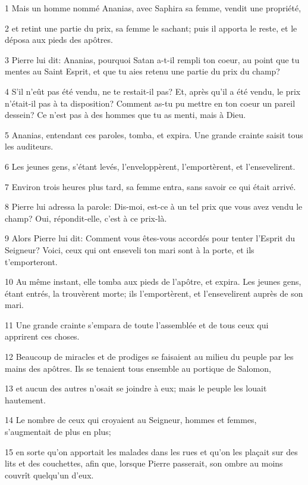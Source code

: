 \par 1 Mais un homme nommé Ananias, avec Saphira sa femme, vendit une propriété,
\par 2 et retint une partie du prix, sa femme le sachant; puis il apporta le reste, et le déposa aux pieds des apôtres.
\par 3 Pierre lui dit: Ananias, pourquoi Satan a-t-il rempli ton coeur, au point que tu mentes au Saint Esprit, et que tu aies retenu une partie du prix du champ?
\par 4 S'il n'eût pas été vendu, ne te restait-il pas? Et, après qu'il a été vendu, le prix n'était-il pas à ta disposition? Comment as-tu pu mettre en ton coeur un pareil dessein? Ce n'est pas à des hommes que tu as menti, mais à Dieu.
\par 5 Ananias, entendant ces paroles, tomba, et expira. Une grande crainte saisit tous les auditeurs.
\par 6 Les jeunes gens, s'étant levés, l'enveloppèrent, l'emportèrent, et l'ensevelirent.
\par 7 Environ trois heures plus tard, sa femme entra, sans savoir ce qui était arrivé.
\par 8 Pierre lui adressa la parole: Dis-moi, est-ce à un tel prix que vous avez vendu le champ? Oui, répondit-elle, c'est à ce prix-là.
\par 9 Alors Pierre lui dit: Comment vous êtes-vous accordés pour tenter l'Esprit du Seigneur? Voici, ceux qui ont enseveli ton mari sont à la porte, et ils t'emporteront.
\par 10 Au même instant, elle tomba aux pieds de l'apôtre, et expira. Les jeunes gens, étant entrés, la trouvèrent morte; ils l'emportèrent, et l'ensevelirent auprès de son mari.
\par 11 Une grande crainte s'empara de toute l'assemblée et de tous ceux qui apprirent ces choses.
\par 12 Beaucoup de miracles et de prodiges se faisaient au milieu du peuple par les mains des apôtres. Ils se tenaient tous ensemble au portique de Salomon,
\par 13 et aucun des autres n'osait se joindre à eux; mais le peuple les louait hautement.
\par 14 Le nombre de ceux qui croyaient au Seigneur, hommes et femmes, s'augmentait de plus en plus;
\par 15 en sorte qu'on apportait les malades dans les rues et qu'on les plaçait sur des lits et des couchettes, afin que, lorsque Pierre passerait, son ombre au moins couvrît quelqu'un d'eux.
